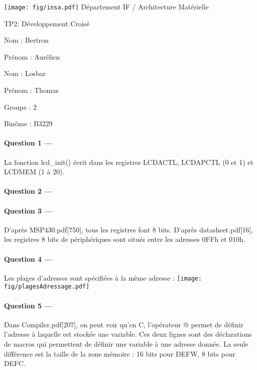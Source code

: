 \documentclass[a4paper,11pt,article]{memoir}
\renewcommand\title[1]{{\LARGE\fontfamily{pag}\selectfont #1}\par\bigskip}
\begin{document}
\texttt{[image: fig/insa.pdf]}
%
\hfill
%
{\selectfont Département IF / Architecture Matérielle}

\bigskip

\title{TP2: Développement Croisé}

\bigskip
\noindent\par\parbox{.48\textwidth}{Nom : Bertron} \parbox{.48\textwidth}{Prénom : Aurélien}
\bigskip
\noindent\par\parbox{.48\textwidth}{Nom : Losbar} \parbox{.48\textwidth}{Prénom : Thomas}
\bigskip
\noindent\par\parbox{.2\textwidth}{Groupe : 2} \parbox{.2\textwidth}{Binôme : B3229}

\bigskip

\paragraph{Question 1 ---}  La fonction lcd_init() écrit dans les registres LCDACTL, LCDAPCTL (0 et 1) et LCDMEM (1 à 20).

\paragraph{Question 2 ---}  

\paragraph{Question 3 ---}  D'après MSP430.pdf[750], tous les registres font 8 bits. D'après datasheet.pdf[16], les registres 8 bits de périphériques sont situés entre les adresses 0FFh et 010h.

\paragraph{Question 4 ---}  Les plages d'adresses sont spécifiées à la même adresse :
\texttt{[image: fig/plagesAdressage.pdf]}

\paragraph{Question 5 ---}  Dans Compiler.pdf[207], on peut voir qu'en C, l'opérateur @ permet de définir l'adresse à laquelle est stockée une variable. Ces deux lignes sont des déclarations de macros qui permettent de définir une variable à une adresse donnée. La seule différence est la taille de la zone mémoire : 16 bits pour DEFW, 8 bits pour DEFC.
\end{document}
